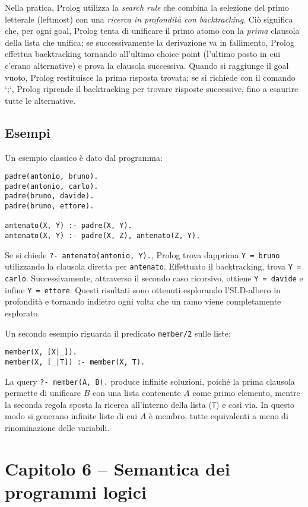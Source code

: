 \documentclass[12pt]{article}
\begin{document}
Nella pratica, Prolog utilizza la \emph{search rule} che combina la selezione del primo letterale (leftmost) con una \emph{ricerca in profondità con backtracking}. Ciò significa che, per ogni goal, Prolog tenta di unificare il primo atomo con la \emph{prima} clausola della lista che unifica; se successivamente la derivazione va in fallimento, Prolog effettua backtracking tornando all'ultimo choice point (l'ultimo posto in cui c'erano alternative) e prova la clausola successiva. Quando si raggiunge il goal vuoto, Prolog restituisce la prima risposta trovata; se si richiede con il comando `;`, Prolog riprende il backtracking per trovare risposte successive, fino a esaurire tutte le alternative.

\subsection*{Esempi}
Un esempio classico è dato dal programma:
\begin{verbatim}
padre(antonio, bruno).
padre(antonio, carlo).
padre(bruno, davide).
padre(bruno, ettore).

antenato(X, Y) :- padre(X, Y).
antenato(X, Y) :- padre(X, Z), antenato(Z, Y).
\end{verbatim}
Se si chiede \texttt{?- antenato(antonio, Y).}, Prolog trova dapprima \texttt{Y = bruno} utilizzando la clausola diretta per \texttt{antenato}. Effettuato il backtracking, trova \texttt{Y = carlo}. Successivamente, attraverso il secondo caso ricorsivo, ottiene \texttt{Y = davide} e infine \texttt{Y = ettore}. Questi risultati sono ottenuti esplorando l'SLD-albero in profondità e tornando indietro ogni volta che un ramo viene completamente esplorato.

Un secondo esempio riguarda il predicato \texttt{member/2} sulle liste:
\begin{verbatim}
member(X, [X|_]).
member(X, [_|T]) :- member(X, T).
\end{verbatim}
La query \texttt{?- member(A, B).} produce infinite soluzioni, poiché la prima clausola permette di unificare $B$ con una lista contenente $A$ come primo elemento, mentre la seconda regola sposta la ricerca all'interno della lista (\texttt{T}) e così via. In questo modo si generano infinite liste di cui $A$ è membro, tutte equivalenti a meno di rinominazione delle variabili.

\section*{Capitolo 6 – Semantica dei programmi logici}
\end{document}
